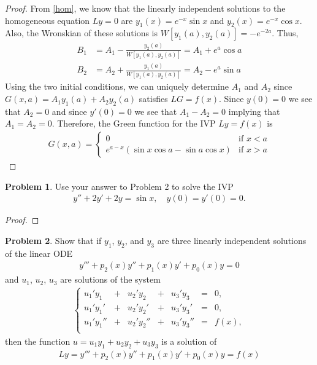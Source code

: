 \documentclass[12pt]{article}
\theoremstyle{definition}
\newtheorem{problem}{Problem}
\begin{document}
\begin{proof}
  From \eqref{hom}, we know that the linearly independent solutions to the
  homogeneous equation $Ly = 0$ are $y_1(x) = e^{-x}\sin x$ and $y_2(x) = e^{-x}\cos x$.
  Also, the Wronskian of these solutions is $W[y_1(a), y_2(a)] = -e^{-2a}$. Thus,
  \begin{align*}
    B_1 &= A_1 - \frac{y_2(a)}{W[y_1(a),y_2(a)]} = A_1 + e^{a}\cos a \\
    B_2 &= A_2 + \frac{y_1(a)}{W[y_1(a),y_2(a)]} = A_2 - e^{a}\sin a
  \end{align*}
  Using the two initial conditions, we can uniquely determine $A_1$ and $A_2$
  since $G(x, a) = A_1y_1(a) + A_2y_2(a)$ satisfies $LG = f(x)$. Since $y(0) = 0$
  we see that $A_2 = 0$ and since $y'(0) = 0$ we see that $A_1 - A_2 = 0$ implying that
  $A_1 = A_2 = 0$. Therefore, the Green function for the IVP $Ly = f(x)$ is
  \begin{align}\label{green}
    G(x, a) =
    \begin{cases}
      0 & \text{if $x < a$} \\
      e^{a-x}\left(\sin x\cos a  - \sin a \cos x\right)  & \text{if $x > a$}
    \end{cases}
  \end{align}
\end{proof}
\newpage


\begin{problem}
  Use your answer to Problem 2 to solve the IVP
  \begin{align*}
    y'' + 2y' + 2y = \sin x, \quad y(0) = y'(0) = 0.
  \end{align*}
\end{problem}

\begin{proof}
\end{proof}
\newpage


\begin{problem}
  Show that if $y_1$, $y_2$, and $y_3$ are three linearly independent solutions
  of the linear ODE
  \begin{align*}
    y''' + p_2(x)y'' + p_1(x)y' + p_0(x) y = 0
  \end{align*}
  and $u_1$, $u_2$, $u_3$ are solutions of the system
  \begin{align}\label{u_system}
    \left\{
      \begin{array}{lllllll}
        u_1'y_1 &+& u_2'y_2 &+& u_3'y_3 &=& 0, \\
        u_1'y_1' &+& u_2'y_2' &+& u_3'y_3' &=& 0, \\
        u_1'y_1'' &+& u_2'y_2'' &+& u_3'y_3'' &=& f(x), \\
      \end{array}
    \right.
  \end{align}
  then the function $u = u_1 y_1 + u_2 y_2 + u_3 y_3$ is a solution of
  \begin{align*}
    Ly = y''' + p_2(x)y'' + p_1(x)y' + p_0(x) y = f(x)
  \end{align*}
\end{problem}
\end{document}
